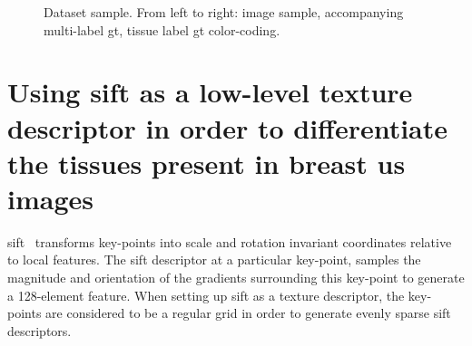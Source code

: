 \documentclass[a4paper, 10pt, conference]{llncs}      %
\begin{document}
\begin{figure}[Hbp]

\caption{Dataset sample. From left to right: image sample, accompanying multi-label \ac{gt}, tissue label \ac{gt} color-coding.}
\label{fig:dataExample}
\end{figure}

\section{Using \ac{sift} as a low-level texture descriptor in order to differentiate the tissues present in breast \acs{us} images}
\acf{sift}~\cite{lowe2004distinctive} transforms key-points into scale and rotation invariant coordinates relative to local features. The \ac{sift} descriptor at a particular key-point, samples the magnitude and orientation of the gradients surrounding this key-point to generate a 128-element feature. When setting up \ac{sift} as a texture descriptor, the key-points are considered to be a regular grid in order to generate evenly sparse \ac{sift} descriptors.
\end{document}
